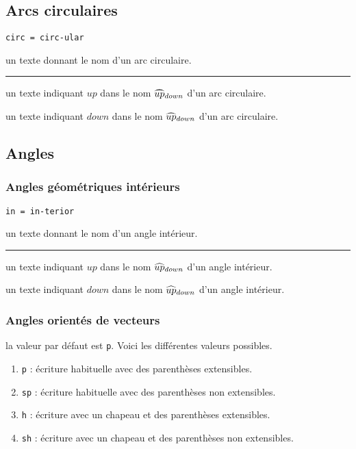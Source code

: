 \documentclass[12pt,a4paper]{article}
\theoremstyle{definition}
\newcommand\separation{
	\medskip
	\hfill\rule{0.5\textwidth}{0.75pt}\hfill
	\medskip
}
\newcommand\mwhyprefix[2]{%
	\texttt{#1 = #1-#2}%
}
\begin{document}
\subsection{Arcs circulaires}



 \hfill \mwhyprefix{circ}{ular}

\IDarg{} un texte donnant le nom d'un arc circulaire.


\separation



 un texte indiquant $up$ dans le nom $\circarc*{up}{down}$ d'un arc circulaire.

 un texte indiquant $down$ dans le nom $\circarc*{up}{down}$ d'un arc circulaire.


\subsection{Angles}

\subsubsection{Angles géométriques \og intérieurs \fg}



  \hfill \mwhyprefix{in}{terior}

\IDarg{} un texte donnant le nom d'un angle intérieur.


\separation



 un texte indiquant $up$ dans le nom $\anglein*{up}{down}$ d'un angle intérieur.

 un texte indiquant $down$ dans le nom $\anglein*{up}{down}$ d'un angle intérieur.


\subsubsection{Angles orientés de vecteurs}




\IDoption{} la valeur par défaut est \verb+p+.  Voici les différentes valeurs possibles.
\begin{enumerate}
	\item \verb+p+ : écriture habituelle avec des parenthèses extensibles.

	\item \verb+sp+ : écriture habituelle avec des parenthèses non extensibles.

	\item \verb+h+ : écriture avec un chapeau et des parenthèses extensibles.

	\item \verb+sh+ : écriture avec un chapeau et des parenthèses non extensibles.
\end{enumerate}
\end{document}
